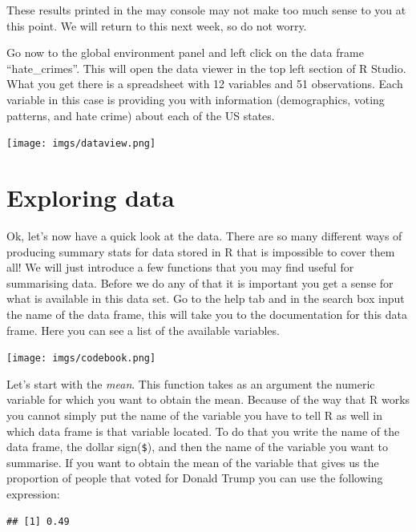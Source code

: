 \documentclass[
]{book}
\newenvironment{Shaded}{\begin{snugshade}}{\end{snugshade}}
\newcommand{\FunctionTok}[1]{\textcolor[rgb]{0.00,0.00,0.00}{#1}}
\newcommand{\NormalTok}[1]{#1}
\newcommand{\SpecialCharTok}[1]{\textcolor[rgb]{0.00,0.00,0.00}{#1}}
\begin{document}
These results printed in the may console may not make too much sense to you at this point. We will return to this next week, so do not worry.

Go now to the global environment panel and left click on the data frame ``hate\_crimes''. This will open the data viewer in the top left section of R Studio. What you get there is a spreadsheet with 12 variables and 51 observations. Each variable in this case is providing you with information (demographics, voting patterns, and hate crime) about each of the US states.

\texttt{[image: imgs/dataview.png]}

\hypertarget{exploring-data}{%
\section{Exploring data}\label{exploring-data}}

Ok, let's now have a quick look at the data. There are so many different ways of producing summary stats for data stored in R that is impossible to cover them all! We will just introduce a few functions that you may find useful for summarising data. Before we do any of that it is important you get a sense for what is available in this data set. Go to the help tab and in the search box input the name of the data frame, this will take you to the documentation for this data frame. Here you can see a list of the available variables.

\texttt{[image: imgs/codebook.png]}

Let's start with the \emph{mean}. This function takes as an argument the numeric variable for which you want to obtain the mean. Because of the way that R works you cannot simply put the name of the variable you have to tell R as well in which data frame is that variable located. To do that you write the name of the data frame, the dollar sign(\texttt{\$}), and then the name of the variable you want to summarise. If you want to obtain the mean of the variable that gives us the proportion of people that voted for Donald Trump you can use the following expression:

\begin{Shaded}
\end{Shaded}

\begin{verbatim}
## [1] 0.49
\end{verbatim}
\end{document}
